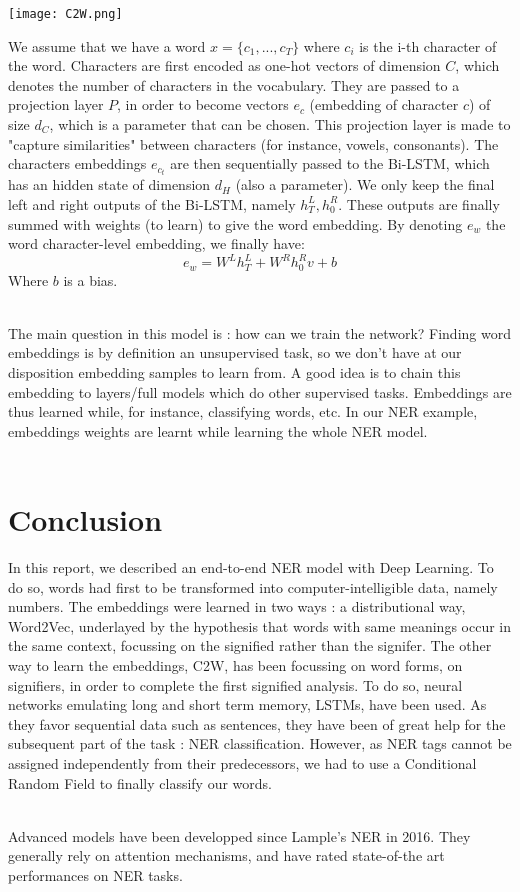 \documentclass{article}
\begin{document}
\begin{center}
    \label{fig:C2W}
    \texttt{[image: C2W.png]}
\end{center}
We assume that we have a word $x = \{c_1, ..., c_T \}$ where $c_i$ is the i-th character of the word.
Characters are first encoded as one-hot vectors of dimension $C$, which denotes the number 
of characters in the vocabulary. They are passed to a projection layer $P$, 
in order to become vectors $e_c$ (embedding of character $c$) of size 
$d_C$, which is a parameter that can be chosen. This projection layer is made to "capture similarities" 
between characters (for instance, vowels, consonants). 
The characters embeddings $e_{c_t}$ are then sequentially passed to the Bi-LSTM, which has 
an hidden state of dimension $d_H$ (also a parameter). We only keep the final left and right outputs of
the Bi-LSTM, namely $h_T^L, h_0^R$. These outputs are finally summed with weights (to learn) to give the word embedding. 
By denoting $e_w$ the word character-level embedding, we finally have:
\[ e_w = W^L h_T^L + W^R h_0^Rv + b \]
Where $b$ is a bias.\\ \par
 The main question in this model is : how can we train the network? Finding word embeddings
is by definition an unsupervised task, so we don't have at our disposition embedding samples to learn from.
A good idea is to chain this embedding to layers/full models which do other supervised tasks. 
Embeddings are thus learned while, for instance, classifying words, etc. In our NER example, 
embeddings weights are learnt while learning the whole NER model. \\ \par 

\newpage
\section*{Conclusion}


In this report, we described an end-to-end NER model with Deep Learning. 
To do so, words had first to be transformed into computer-intelligible data, namely numbers. 
The embeddings were learned in two ways : a distributional way, Word2Vec, underlayed by the hypothesis
that words with same meanings occur in the same context, focussing on the signified
rather than the signifer. The other way to learn the embeddings, C2W, has been focussing on word forms, 
on signifiers, in order to complete the first signified analysis. To do so, neural networks 
emulating long and short term memory, LSTMs, have been used. As they 
favor sequential data such as sentences, they have been of great
help for the subsequent part of the task : NER classification. However, as NER tags
cannot be assigned independently from their predecessors, we had to use a Conditional
Random Field to finally classify our words. \\ \par

Advanced models have been developped since Lample's NER in 2016. They generally rely
on attention mechanisms, and have rated state-of-the art performances on NER tasks.
 
\newpage
 

\end{document}

